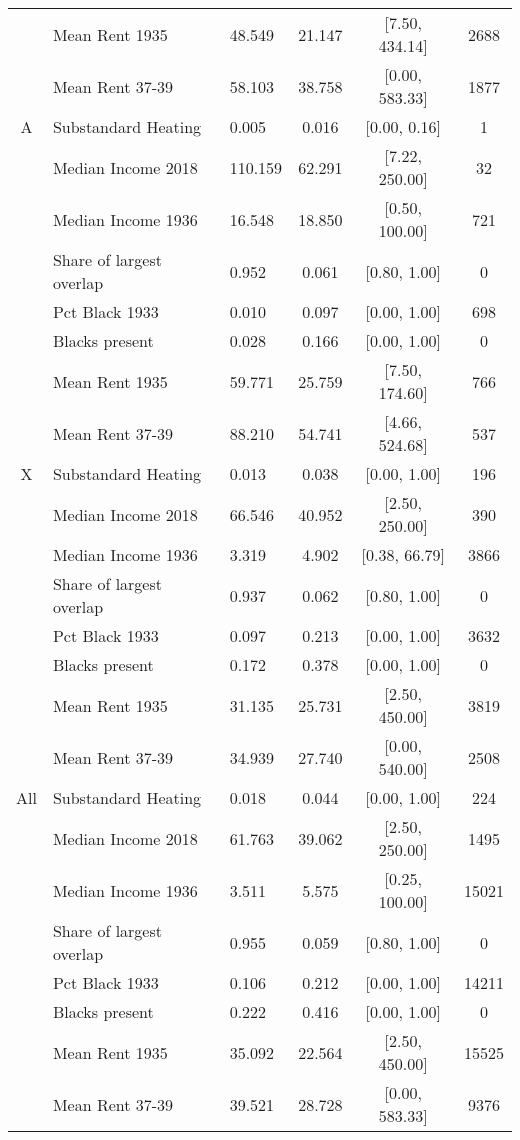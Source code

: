\documentclass[border=1mm, preview]{standalone}
\begin{document}
\begin{table}
{\begin{tabular}[t]{cllccc}
 & Mean Rent 1935 & 48.549 & 21.147 & [7.50, 434.14] & 2688\\
 & Mean Rent 37-39 & 58.103 & 38.758 & [0.00, 583.33] & 1877\\
A & Substandard Heating & 0.005 & 0.016 & [0.00, 0.16] & 1\\
 & Median Income 2018 & 110.159 & 62.291 & [7.22, 250.00] & 32\\
 & Median Income 1936 & 16.548 & 18.850 & [0.50, 100.00] & 721\\
 & Share of largest overlap & 0.952 & 0.061 & [0.80, 1.00] & 0\\
 & Pct Black 1933 & 0.010 & 0.097 & [0.00, 1.00] & 698\\
 & Blacks present & 0.028 & 0.166 & [0.00, 1.00] & 0\\
 & Mean Rent 1935 & 59.771 & 25.759 & [7.50, 174.60] & 766\\
 & Mean Rent 37-39 & 88.210 & 54.741 & [4.66, 524.68] & 537\\
X & Substandard Heating & 0.013 & 0.038 & [0.00, 1.00] & 196\\
 & Median Income 2018 & 66.546 & 40.952 & [2.50, 250.00] & 390\\
 & Median Income 1936 & 3.319 & 4.902 & [0.38, 66.79] & 3866\\
 & Share of largest overlap & 0.937 & 0.062 & [0.80, 1.00] & 0\\
 & Pct Black 1933 & 0.097 & 0.213 & [0.00, 1.00] & 3632\\
 & Blacks present & 0.172 & 0.378 & [0.00, 1.00] & 0\\
 & Mean Rent 1935 & 31.135 & 25.731 & [2.50, 450.00] & 3819\\
 & Mean Rent 37-39 & 34.939 & 27.740 & [0.00, 540.00] & 2508\\
All & Substandard Heating & 0.018 & 0.044 & [0.00, 1.00] & 224\\
 & Median Income 2018 & 61.763 & 39.062 & [2.50, 250.00] & 1495\\
 & Median Income 1936 & 3.511 & 5.575 & [0.25, 100.00] & 15021\\
 & Share of largest overlap & 0.955 & 0.059 & [0.80, 1.00] & 0\\
 & Pct Black 1933 & 0.106 & 0.212 & [0.00, 1.00] & 14211\\
 & Blacks present & 0.222 & 0.416 & [0.00, 1.00] & 0\\
 & Mean Rent 1935 & 35.092 & 22.564 & [2.50, 450.00] & 15525\\
 & Mean Rent 37-39 & 39.521 & 28.728 & [0.00, 583.33] & 9376\\
\bottomrule
\end{tabular}}
\end{table}
\end{document}
